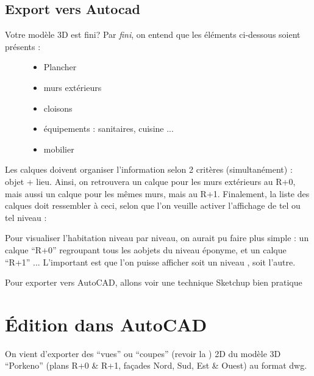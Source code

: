 \documentclass[a4paper,12pt,french]{sphinxmanual}
\begin{document}
\subsection{Export vers Autocad}
\label{init_su+acad/su1:export-vers-autocad}\begin{description}
\item[{Votre modèle 3D est fini? Par \emph{fini}, on entend que les éléments ci-dessous soient présents :}] \leavevmode\begin{itemize}
\item {} 
Plancher

\item {} 
murs extérieurs

\item {} 
cloisons

\item {} 
équipements : sanitaires, cuisine ...

\item {} 
mobilier

\end{itemize}

\end{description}

Les calques doivent organiser l'information selon 2 critères (simultanément) : objet + lieu. Ainsi, on retrouvera un calque pour les murs extérieurs au R+0, mais aussi un calque pour les mêmes murs, mais au R+1. Finalement, la liste des calques doit ressembler à ceci, selon que l'on veuille activer l'affichage de tel ou tel niveau :
\begin{figure}[htbp]
\centering

\noindent{}
\end{figure}
\begin{figure}[htbp]
\centering

\noindent{}
\end{figure}

Pour visualiser l'habitation niveau par niveau, on aurait pu faire plus simple : un calque ``R+0'' regroupant tous les aobjets du niveau éponyme, et un calque ``R+1'' ... L'important est que l'on puisse afficher soit un niveau , soit l'autre.

Pour exporter vers AutoCAD, allons voir une technique Sketchup bien pratique {\hyperref[su/export\string-dwg:export\string-dwg]{}}


\section{Édition dans AutoCAD}
\label{init_su+acad/acad1:edition-dans-autocad}\label{init_su+acad/acad1::doc}
On vient d'exporter des ``vues'' ou ``coupes'' (revoir la {\hyperref[su/export\string-dwg:export\string-dwg]{}} ) 2D du modèle 3D ``Porkeno'' (plans R+0 \& R+1, façades Nord, Sud, Est \& Ouest) au format dwg.
\end{document}
